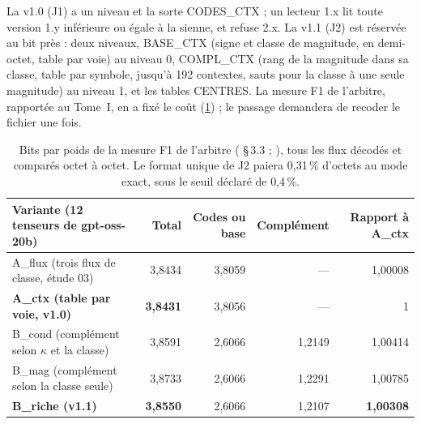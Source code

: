 La v1.0 (J1) a un niveau et la sorte CODES\_CTX ; un lecteur 1.x lit toute version 1.y inférieure ou égale à la sienne, et refuse 2.x. La v1.1 (J2) est réservée au bit près : deux niveaux, BASE\_CTX (signe et classe de magnitude, en demi-octet, table par voie) au niveau 0, COMPL\_CTX (rang de la magnitude dans sa classe, table par symbole, jusqu'à 192 contextes, sauts pour la classe à une seule magnitude) au niveau 1, et les tables CENTRES. La mesure F1 de l'arbitre, rapportée au Tome~I, en a fixé le coût (\cref{t2fmt:tab:fun}) ; le passage demandera de recoder le fichier une fois.

\begin{table}[ht]
\centering\small
\begin{tabular}{l r r r r}
\toprule
Variante (12 tenseurs de gpt-oss-20b) & Total & Codes ou base & Complément & Rapport à A\_ctx \\
\midrule
A\_flux (trois flux de classe, étude 03) & 3,8434 & 3,8059 & — & 1,00008 \\
\textbf{A\_ctx (table par voie, v1.0)} & \textbf{3,8431} & 3,8056 & — & 1 \\
B\_cond (complément selon $\kappa$ et la classe) & 3,8591 & 2,6066 & 1,2149 & 1,00414 \\
B\_mag (complément selon la classe seule) & 3,8733 & 2,6066 & 1,2291 & 1,00785 \\
\textbf{B\_riche (v1.1)} & \textbf{3,8550} & 2,6066 & 1,2107 & \textbf{1,00308} \\
\bottomrule
\end{tabular}
\caption[Ce que coûte la découpe de la v1.1]{Bits par poids de la mesure F1 de l'arbitre ( §\,3.3 ; ), tous les flux décodés et comparés octet à octet. Le format unique de J2 paiera 0,31\,\% d'octets au mode exact, sous le seuil déclaré de 0,4\,\%.}
\label{t2fmt:tab:fun}
\end{table}

